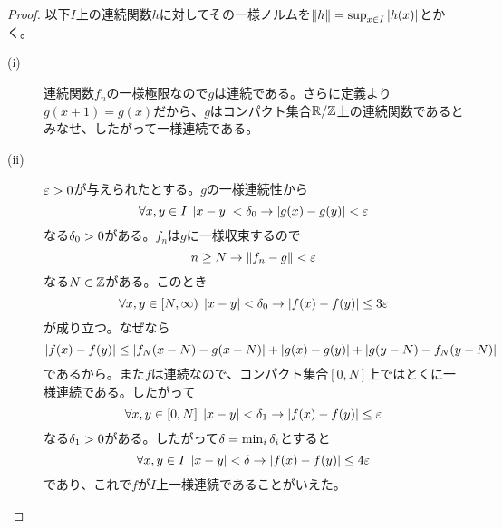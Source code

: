 \begin{proof} 以下$I$上の連続関数$h$に対してその一様ノルムを$\left \lVert h \right \rVert = \sup_{x \in I} \left \lvert h(x) \right \rvert$とかく。
  \begin{description}
    \item[(i)] 連続関数$f_n$の一様極限なので$g$は連続である。さらに定義より$g(x+1)=g(x)$だから、$g$はコンパクト集合${\mathbb R} / {\mathbb Z}$上の連続関数であるとみなせ、したがって一様連続である。
    \item[(ii)] ${\varepsilon} > 0$が与えられたとする。$g$の一様連続性から
    \[
    \forall x,y \in I \; \left \lvert x-y \right \rvert< {\delta}_0 \to \left \lvert g(x) - g(y)  \right \rvert < {\varepsilon}
    \]
    なる${\delta}_0 > 0$がある。$f_n$は$g$に一様収束するので
    \[
    n \geq N \to \left \lVert f_n - g \right \rVert < {\varepsilon}
    \]
    なる$N \in {\mathbb Z}$がある。このとき
    \[
    \forall x,y \in [N,\infty) \; \left \lvert x - y  \right \rvert < {\delta}_0 \to \left \lvert f(x) - f(y) \right \rvert \leq 3{\varepsilon}
    \]
    が成り立つ。なぜなら
    \[
    \left \lvert f(x) - f(y) \right \rvert  \leq \left \lvert f_N(x-N) - g(x-N) \right \rvert + \left \lvert g(x)-g(y) \right \rvert + \left \lvert g(y-N)-f_N(y-N) \right \rvert
    \]
    であるから。また$f$は連続なので、コンパクト集合$[0,N]$上ではとくに一様連続である。したがって
    \[
    \forall x,y \in [0,N] \; \left \lvert x - y  \right \rvert < {\delta}_1 \to \left \lvert f(x) - f(y) \right \rvert \leq {\varepsilon}
    \]
    なる${\delta}_1 > 0$がある。したがって${\delta}= \min_i{{\delta}_i}$とすると
    \[
    \forall x,y \in I \; \left \lvert x - y  \right \rvert < {\delta} \to \left \lvert f(x) - f(y) \right \rvert \leq 4{\varepsilon}
    \]
    であり、これで$f$が$I$上一様連続であることがいえた。
  \end{description}
\end{proof}






\newpage



